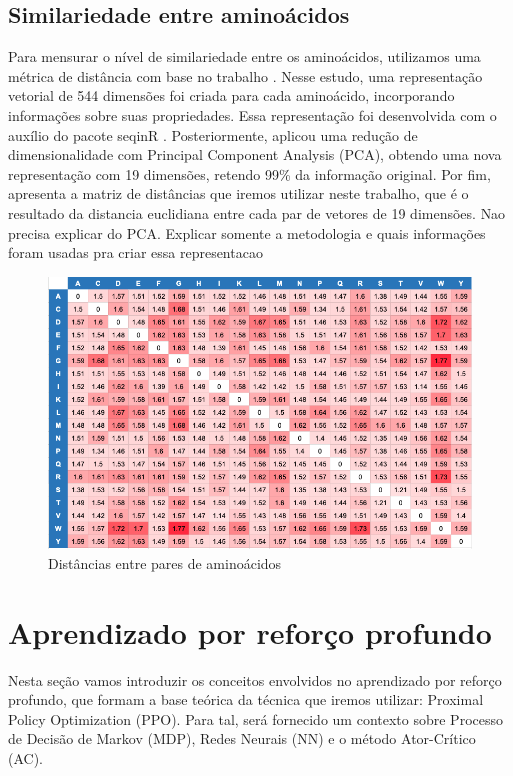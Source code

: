 \subsection{Similariedade entre aminoácidos}
Para mensurar o nível de similariedade entre os aminoácidos, utilizamos uma métrica de distância com base no trabalho \cite{aminodist}.
Nesse estudo, uma representação vetorial de 544 dimensões foi criada para cada aminoácido, incorporando informações sobre suas propriedades.
Essa representação foi desenvolvida com o auxílio do pacote seqinR \cite{seqinR}. 
Posteriormente, \cite{aminodist} aplicou uma redução de dimensionalidade com Principal Component Analysis (PCA), 
obtendo uma nova representação com 19 dimensões, retendo 99\% da informação original. 
Por fim, \cite{aminodist} apresenta a matriz de distâncias que iremos utilizar neste trabalho,
que é o resultado da distancia euclidiana entre cada par de vetores de 19 dimensões. 
{\color{red} Nao precisa explicar do PCA. Explicar somente a metodologia e quais informações foram usadas pra criar essa representacao}

\begin{figure}[H]
    \centering
    \includegraphics[width=.8\textwidth]{figuras/matrix_amino_dist.png}
    \caption{Distâncias entre pares de aminoácidos \cite{aminodist}}
    \label{fig:matrixaminodist}
  \end{figure}


\section{Aprendizado por reforço profundo}
Nesta seção vamos introduzir os conceitos envolvidos no aprendizado por reforço profundo, que formam a base teórica da técnica que iremos utilizar: Proximal Policy Optimization (PPO). 
Para tal, será fornecido um contexto sobre Processo de Decisão de Markov (MDP), Redes Neurais (NN) e o método Ator-Crítico (AC). 



